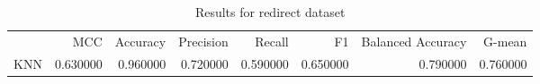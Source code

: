 \begin{table}
\caption{Results for redirect dataset}
\begin{tabular}{lrrrrrrr}
 & MCC & Accuracy & Precision & Recall & F1 & Balanced Accuracy & G-mean \\
KNN & 0.630000 & 0.960000 & 0.720000 & 0.590000 & 0.650000 & 0.790000 & 0.760000 \\
\end{tabular}
\end{table}
